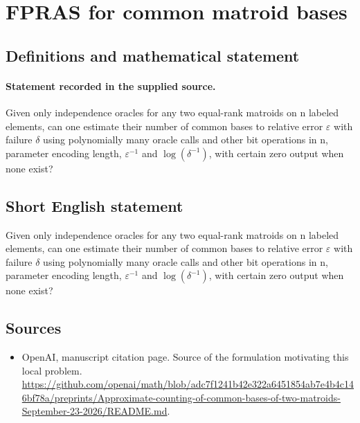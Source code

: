 \documentclass[11pt]{article}
\begin{document}
\section*{FPRAS for common matroid bases}\label{statement}
\subsection{Definitions and mathematical statement}
\paragraph{Statement recorded in the supplied source.}
Given only independence oracles for any two equal-rank matroids on n labeled elements, can one estimate their number of common bases to relative error $\varepsilon $ with failure $\delta $ using polynomially many oracle calls and other bit operations in n, parameter encoding length, $\varepsilon ^{-1}$ and $\log (\delta ^{-1})$, with certain zero output when none exist?
\subsection{Short English statement}
Given only independence oracles for any two equal-rank matroids on n labeled elements, can one estimate their number of common bases to relative error $\varepsilon $ with failure $\delta $ using polynomially many oracle calls and other bit operations in n, parameter encoding length, $\varepsilon ^{-1}$ and $\log (\delta ^{-1})$, with certain zero output when none exist?
\subsection{Sources}
\begin{itemize}
\item[S1] OpenAI, manuscript citation page. Source of the formulation motivating this local problem.
\url{https://github.com/openai/math/blob/adc7f1241b42e322a6451854ab7e4b4c146bf78a/preprints/Approximate-counting-of-common-bases-of-two-matroids-September-23-2026/README.md}.
\end{itemize}
\end{document}

